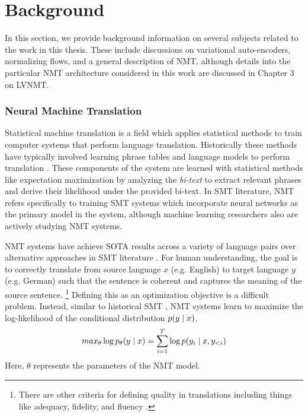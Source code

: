\chapter{Background}

In this section, we provide background information on several subjects related to the work in this thesis. These include discussions on variational auto-encoders, normalizing flows, and a general description of \ac{NMT}, although details into the particular \ac{NMT} architecture considered in this work are discussed in Chapter 3 on \ac{LVNMT}. %



\subsection{Neural Machine Translation}

Statistical machine translation is a field which applies statistical methods to train computer systems that perform language translation. Historically these methods have typically involved learning phrase tables and language models to perform translation \cite{koehnSMT2010}. These components of the system are learned with statistical methods like expectation maximization by analyzing the \textit{bi-text} to extract relevant phrases and derive their likelihood under the provided bi-text.  In \ac{SMT} literature, \ac{NMT} refers specifically to training \ac{SMT} systems which incorporate neural networks as the primary model in the system, although machine learning researchers also are actively studying \ac{NMT} systems. 

\ac{NMT} systems have achieve \ac{SOTA} results across a variety of language pairs over alternative approaches in \ac{SMT} literature \cite{bahdanau2014NMTBYJoint,koehn2017NMT,vaswani2017attentionTransformer}. For human understanding, the goal is to correctly translate from source language $x$ (e.g. English) to target language $y$ (e.g. German) such that the sentence is coherent and captures the meaning of the source sentence. \footnote{There are other criteria for defining quality in translations including things like adequacy, fidelity, and fluency \cite{Papineni2002BLEU}.} Defining this as an optimization  objective is a difficult problem. Instead, similar to historical \ac{SMT} , \ac{NMT} systems learn to maximize the log-likelihood of the conditional distribution $p(y\; | \;{x})$. 
\begin{equation}
	max_{\theta} \log p_{\theta}(y \; | \;{x})  = \sum_{i=1}^{T} \log p(y_{i} \; | \;{x, y_{<i}})
\end{equation}
Here, $\theta$ represents the parameters of the \ac{NMT} model. 

